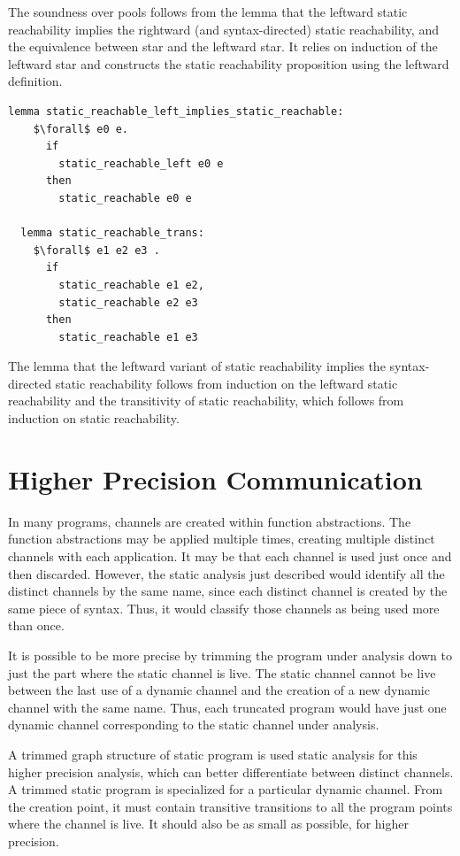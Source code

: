 \documentclass{article}
\begin{document}
The soundness over pools follows from the lemma that the leftward
static reachability implies the rightward (and syntax-directed) static reachability,
and the equivalence between star and the leftward star.  It relies on induction of the
leftward star and constructs the static reachability
proposition using the leftward definition.  

\begin{lstlisting}[language=logic, mathescape]
  lemma static_reachable_left_implies_static_reachable:
    $\forall$ e0 e. 
      if
        static_reachable_left e0 e
      then
        static_reachable e0 e

  lemma static_reachable_trans:
    $\forall$ e1 e2 e3 .
      if 
        static_reachable e1 e2,
        static_reachable e2 e3
      then
        static_reachable e1 e3
  \end{lstlisting}


The lemma that the leftward variant of static reachability implies the syntax-directed static
reachability follows from induction on the leftward static reachability and the
transitivity of static
reachability, which follows from induction on static reachability.

\section{Higher Precision Communication}
In many programs, channels are created within function abstractions.  The function abstractions
may be applied multiple times, creating multiple distinct channels with each application.
It may be that each channel is used just once and then discarded.  However, the static
analysis just described would identify all the distinct channels by the same name, since each
distinct channel is created by the same piece of syntax. Thus, it would classify those channels
as being used more than once.

It is possible to be more precise by trimming the program under analysis down to just the part
where the static channel is live. The static channel cannot be live between the last use of a
dynamic channel and the creation of a new dynamic channel with the same name.  Thus, each
truncated program would have just one dynamic channel corresponding to the static channel under
analysis. 

A trimmed graph structure of static program is used static analysis for this higher precision
analysis, which can better differentiate between distinct channels. 
A trimmed static program is specialized for a particular dynamic channel.  From the creation
point, it must contain transitive transitions to all the program points where the
channel is live. It should also be as small as possible, for higher precision.
\end{document}
